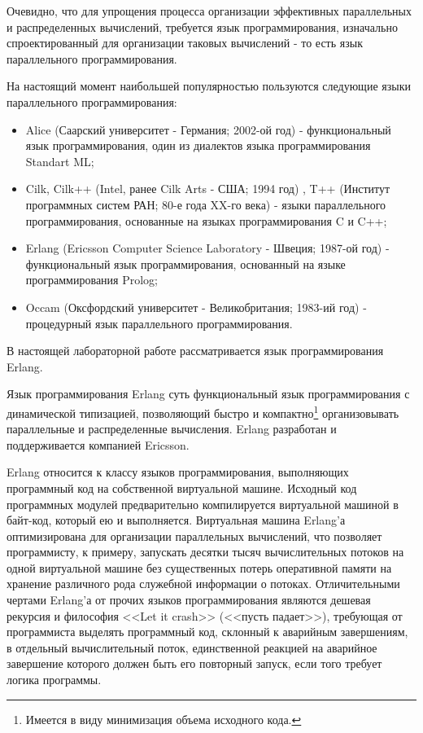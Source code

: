 Очевидно, что для упрощения процесса организации эффективных параллельных и распределенных вычислений, требуется язык программирования, изначально спроектированный для организации таковых вычислений - то есть язык параллельного программирования.

На настоящий момент наибольшей популярностью пользуются следующие языки параллельного программирования:

\begin{itemize}

	\item Alice (Саарский университет - Германия; 2002-ой год) - функциональный язык программирования, один из диалектов языка программирования Standart ML;
	\item Cilk, Cilk++ (Intel, ранее Cilk Arts - США; 1994 год) , T++ (Институт программных систем РАН; 80-е года XX-го века) - языки параллельного программирования, основанные на языках программирования C и C++;
	\item Erlang (Ericsson Computer Science Laboratory - Швеция; 1987-ой год) - функциональный язык программирования, основанный на языке программирования Prolog;
	\item Occam (Оксфордский университет - Великобритания; 1983-ий год) - процедурный язык параллельного программирования.

\end{itemize}

В настоящей лабораторной работе рассматривается язык программирования Erlang.


Язык программирования Erlang \cite{erlang} суть функциональный язык программирования с динамической типизацией, позволяющий быстро и компактно\footnote{Имеется в виду минимизация объема исходного кода.} организовывать параллельные и распределенные вычисления. Erlang разработан и поддерживается компанией Ericsson.

Erlang относится к классу языков программирования, выполняющих программный код на собственной виртуальной машине. Исходный код программных модулей предварительно компилируется виртуальной машиной в байт-код, который ею и выполняется. Виртуальная машина Erlang'а оптимизирована для организации параллельных вычислений, что позволяет программисту, к примеру, запускать десятки тысяч вычислительных потоков на одной виртуальной машине без существенных потерь оперативной памяти на хранение различного рода служебной информации о потоках. Отличительными чертами Erlang'а от прочих языков программирования являются дешевая рекурсия и философия <<Let it crash>> (<<пусть падает>>), требующая от программиста выделять программный код, склонный к аварийным завершениям, в отдельный вычислительный поток, единственной реакцией на аварийное завершение которого должен быть его повторный запуск, если того требует логика программы.

